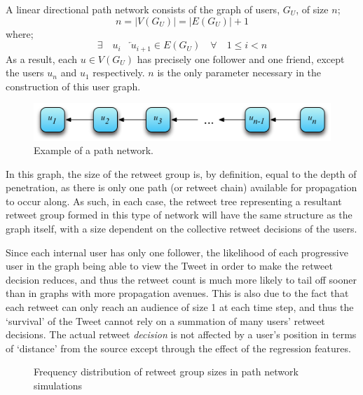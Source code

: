 A linear directional path network consists of the graph of users, $G_U$, of size $n$;
\[
    n = |V(G_U)| = |E(G_U)| + 1
\]
where; 
\[
    \exists \quad \overleftarrow{u_i \quad  u_{i+1}} \in E(G_U) \quad \forall \quad 1 \leq i < n
\]
As a result, each $u \in V(G_U)$ has precisely one follower and one friend, except the users $u_n$ and $u_1$ respectively. $n$ is the only parameter necessary in the construction of this user graph.

\begin{figure}[h]
\centering
\includegraphics[scale=0.8]{4.Chapter2/Media/path_network.png} 
\caption{Example of a path network.}
\label{fig:path_network}
\end{figure}

In this graph, the size of the retweet group is, by definition, equal to the depth of penetration, as there is only one path (or retweet chain) available for propagation to occur along. As such, in each case, the retweet tree representing a resultant retweet group formed in this type of network will have the same structure as the graph itself, with a size dependent on the collective retweet decisions of the users.

Since each internal user has only one follower, the likelihood of each progressive user in the graph being able to view the Tweet in order to make the retweet decision reduces, and thus the retweet count is much more likely to tail off sooner than in graphs with more propagation avenues. This is also due to the fact that each retweet can only reach an audience of size 1 at each time step, and thus the `survival' of the Tweet cannot rely on a summation of many users' retweet decisions. The actual retweet \textit{decision} is not affected by a user's position in terms of `distance' from the source except through the effect of the regression features.

\begin{figure}[h]
\centering
{}
\caption{Frequency distribution of retweet group sizes in path network simulations}
\label{fig:linear}
\end{figure}

